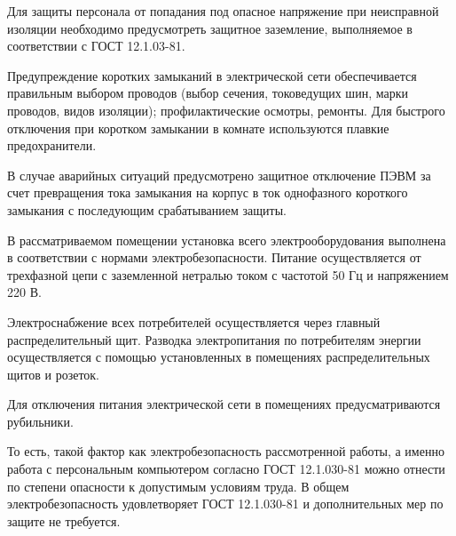 Для защиты персонала от попадания под опасное напряжение при неисправной изоляции необходимо предусмотреть защитное заземление, выполняемое в соответствии с ГОСТ 12.1.03-81.

Предупреждение коротких замыканий в электрической сети обеспечивается правильным выбором проводов (выбор сечения, токоведущих шин, марки проводов, видов изоляции); профилактические осмотры, ремонты.
Для быстрого отключения при коротком замыкании в комнате используются плавкие предохранители.

В случае аварийных ситуаций предусмотрено защитное отключение ПЭВМ за счет превращения тока замыкания на корпус в ток однофазного короткого замыкания с последующим срабатыванием защиты.

В рассматриваемом помещении установка всего электрооборудования выполнена в соответствии с нормами электробезопасности.
Питание осуществляется от трехфазной цепи с заземленной нетралью током с частотой 50 Гц и напряжением 220 В.

Электроснабжение всех потребителей осуществляется через главный распределительный щит.
Разводка электропитания по потребителям энергии осуществляется с помощью установленных в помещениях распределительных щитов и розеток.

Для отключения питания электрической сети в помещениях предусматриваются рубильники.

То есть, такой фактор как электробезопасность рассмотренной работы, а именно работа с персональным компьютером согласно ГОСТ 12.1.030-81 можно отнести по степени опасности к допустимым условиям труда.
В общем электробезопасность удовлетворяет ГОСТ 12.1.030-81 и дополнительных мер по защите не требуется.
